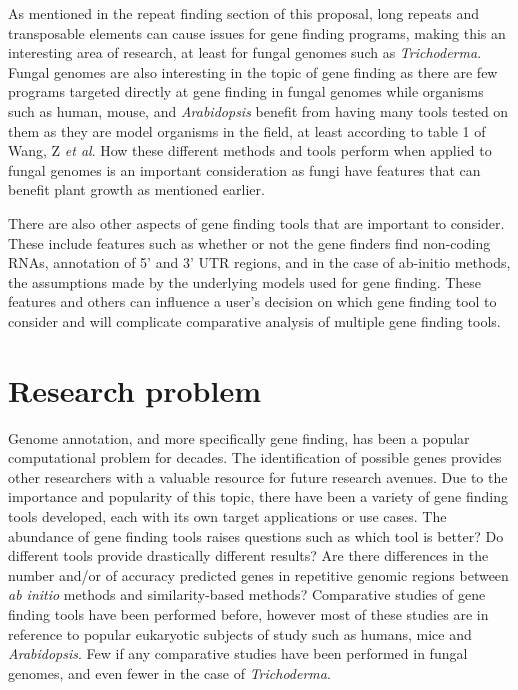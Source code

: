 \documentclass[12pt]{article}
\begin{document}
As mentioned in the repeat finding section of this proposal, long
repeats and transposable elements can cause issues for gene finding
programs, making this an interesting area of research, at least for
fungal genomes such as \textit{Trichoderma}. Fungal genomes are also
interesting in the topic of gene finding as there are few programs
targeted directly at gene finding in fungal genomes while organisms
such as human, mouse, and \textit{Arabidopsis} benefit from having
many tools tested on them as they are model organisms in the field, at
least according to table 1 of Wang, Z \textit{et
  al}\cite{GeneFinding}. How these different methods and tools perform
when applied to fungal genomes is an important consideration as fungi
have features that can benefit plant growth as mentioned earlier.

There are also other aspects of gene finding tools that are important
to consider. These include features such as whether or not the gene
finders find non-coding RNAs, annotation of 5' and 3' UTR regions, and
in the case of ab-initio methods, the assumptions made by the
underlying models used for gene finding. These features and others can
influence a user's decision on which gene finding tool to consider and
will complicate comparative analysis of multiple gene finding tools.


\section{Research problem}
Genome annotation, and more specifically gene finding, has been a
popular computational problem for decades. The identification of
possible genes provides other researchers with a valuable resource for
future research avenues. Due to the importance and popularity of this
topic, there have been a variety of gene finding tools developed, each
with its own target applications or use cases. The abundance of gene
finding tools raises questions such as which tool is better? Do
different tools provide drastically different results? Are there
differences in the number and/or of accuracy predicted genes in
repetitive genomic regions between \textit{ab initio} methods and
similarity-based methods?  Comparative studies of gene finding tools
have been performed before, however most of these studies are in
reference to popular eukaryotic subjects of study such as humans, mice
and \textit{Arabidopsis}. Few if any comparative studies have been
performed in fungal genomes, and even fewer in the case of
\textit{Trichoderma}.
\end{document}
